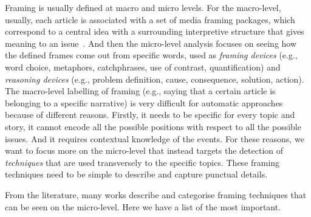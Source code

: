 
Framing is usually defined at macro and micro levels.
For the macro-level, usually, each article is associated with a set of media framing packages, which correspond to a central idea with a surrounding interpretive structure that gives meaning to an issue~\cite{gamson1989media}.
And then the micro-level analysis focuses on seeing how the defined frames come out from specific words, used as \textit{framing devices} (e.g., word choice, metaphors, catchphrases, use of contrast, quantification) and \textit{reasoning devices} (e.g., problem definition, cause, consequence, solution, action).
The macro-level labelling of framing (e.g., saying that a certain article is belonging to a specific narrative) is very difficult for automatic approaches because of different reasons. Firstly, it needs to be specific for every topic and story, it cannot encode all the possible positions with respect to all the possible issues. And it requires contextual knowledge of the events.
For these reasons, we want to focus more on the micro-level that instead targets the detection of \emph{techniques} that are used transversely to the specific topics. These framing techniques need to be simple to describe and capture punctual details.

From the literature, many works describe and categorise framing techniques that can be seen on the micro-level. Here we have a list of the most important.

